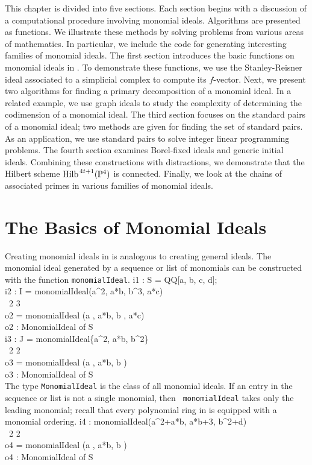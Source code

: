 This chapter is divided into five sections.  Each section begins with
a discussion of a computational procedure involving monomial ideals.
Algorithms are presented as \Mtwo functions.  We illustrate these
methods by solving problems from various areas of mathematics.
In particular, we include the \Mtwo code for generating interesting
families of monomial ideals.  The first section introduces the basic
functions on monomial ideals in \Mtwo.  To demonstrate these functions,
we use the Stanley-Reisner ideal associated to a simplicial complex to
compute its $f$-vector.  Next, we present two algorithms for finding a
primary decomposition of a monomial ideal.  In a related example, we
use graph ideals to study the complexity of determining the
codimension of a monomial ideal.  The third section focuses on the
standard pairs of a monomial ideal; two methods are given for finding
the set of standard pairs.  As an application, we use standard pairs
to solve integer linear programming problems.  The fourth section
examines Borel-fixed ideals and generic initial ideals.  Combining
these constructions with distractions, we demonstrate that the Hilbert
scheme $\operatorname{Hilb}^{\, 4t+1}({\mathbb P}^{4})$ is connected.  Finally, we look at
the chains of associated primes in various families of monomial
ideals.


\section{The Basics of Monomial Ideals}

Creating monomial ideals in \Mtwo is analogous to creating general
ideals.  The monomial ideal generated by a sequence or list of
monomials can be constructed with the function {\tt monomialIdeal}.
\beginOutput
i1 : S = QQ[a, b, c, d]; \\
\endOutput
\beginOutput
i2 : I = monomialIdeal(a^2, a*b, b^3, a*c)\\
\emptyLine
\                     2        3\\
o2 = monomialIdeal (a , a*b, b , a*c)\\
\emptyLine
o2 : MonomialIdeal of S\\
\endOutput
\beginOutput
i3 : J = monomialIdeal\{a^2, a*b, b^2\}\\
\emptyLine
\                     2        2\\
o3 = monomialIdeal (a , a*b, b )\\
\emptyLine
o3 : MonomialIdeal of S\\
\endOutput
The type {\tt MonomialIdeal} is the class of all monomial ideals.  If
an entry in the sequence or list is not a single monomial, then {\tt
monomialIdeal} takes only the leading monomial; recall that every
polynomial ring in \Mtwo is equipped with a monomial ordering.
\beginOutput
i4 : monomialIdeal(a^2+a*b, a*b+3, b^2+d)\\
\emptyLine
\                     2        2\\
o4 = monomialIdeal (a , a*b, b )\\
\emptyLine
o4 : MonomialIdeal of S\\
\endOutput

